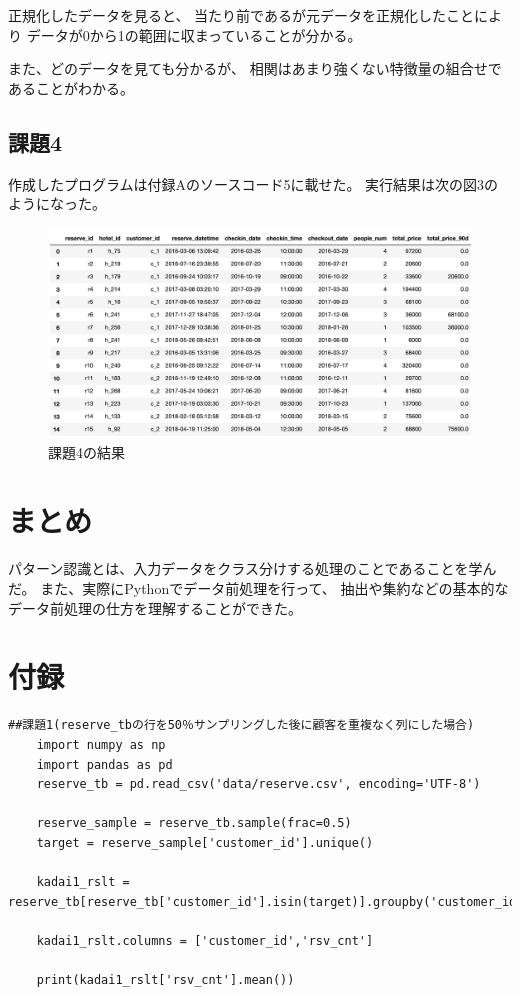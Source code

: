 \documentclass[12pt]{jarticle}
\begin{document}
正規化したデータを見ると、
当たり前であるが元データを正規化したことにより
データが0から1の範囲に収まっていることが分かる。

また、どのデータを見ても分かるが、
相関はあまり強くない特徴量の組合せであることがわかる。

\subsection{課題4}
作成したプログラムは付録Aのソースコード5に載せた。
実行結果は次の図3のようになった。
\begin{figure}[h]
    \begin{center}
        \includegraphics[scale=0.25]{kadai2_1_3.png}
    \end{center}
    \caption{課題4の結果}
\end{figure}

\clearpage
\section{まとめ}
パターン認識とは、入力データをクラス分けする処理のことであることを学んだ。
また、実際にPythonでデータ前処理を行って、
抽出や集約などの基本的なデータ前処理の仕方を理解することができた。
\clearpage
\appendix
\section{付録}

\begin{lstlisting}[style = py,caption=課題1(1)]
    ##課題1(reserve_tbの行を50％サンプリングした後に顧客を重複なく列にした場合)
    import numpy as np
    import pandas as pd
    reserve_tb = pd.read_csv('data/reserve.csv', encoding='UTF-8')
    
    reserve_sample = reserve_tb.sample(frac=0.5)
    target = reserve_sample['customer_id'].unique()
    
    kadai1_rslt = reserve_tb[reserve_tb['customer_id'].isin(target)].groupby('customer_id').size().reset_index()
    
    kadai1_rslt.columns = ['customer_id','rsv_cnt']
    
    print(kadai1_rslt['rsv_cnt'].mean())
\end{lstlisting}
\end{document}
